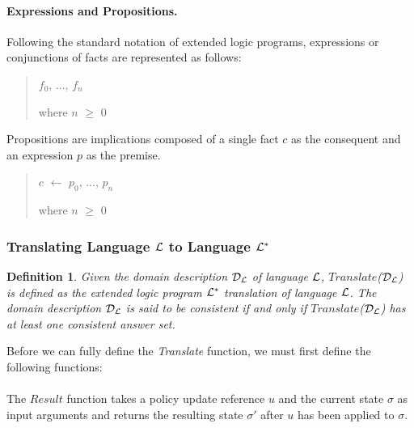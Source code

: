 \documentclass[10pt, twocolumn]{article}
\newtheorem{definition}{Definition}
\begin{document}
        \paragraph{Expressions and Propositions.}

          Following the standard notation of extended logic programs,
          expressions or conjunctions of facts are represented as follows:

          \begin{quote}
            $f_{0}$, ..., $f_{n}$

            where $n$ $\geq$ $0$
          \end{quote}

          Propositions are implications composed of a single fact $c$ as the
          consequent and an expression $p$ as the premise.

          \begin{quote}
            $c$ $\leftarrow$ $p_{0}$, ..., $p_{n}$

            where $n$ $\geq$ $0$
          \end{quote}

      \subsubsection{Translating Language ${\cal L}$ to Language ${\cal L^{*}}$}

        \begin{definition}
          Given the domain description ${\cal D}_{\cal L}$ of language
          ${\cal L}$, $Translate$(${\cal D}_{\cal L}$) is defined as the
          extended logic program ${\cal L}^{*}$ translation of language
          ${\cal L}$. The domain description ${\cal D}_{\cal L}$ is said to be
          {\em consistent} if and only if $Translate$(${\cal D}_{\cal L}$) has
          at least one consistent answer set. 
        \end{definition}

        Before we can fully define the \emph{Translate} function, we must first
        define the following functions:

        \paragraph{}

          The $Result$ function takes a policy update reference $u$ and the
          current state $\sigma$ as input arguments and returns the resulting
          state $\sigma'$ after $u$ has been applied to $\sigma$.
 
\end{document}
